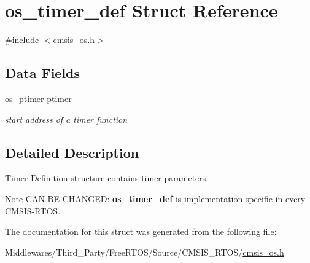 \hypertarget{structos__timer__def}{}\section{os\+\_\+timer\+\_\+def Struct Reference}
\label{structos__timer__def}


{\ttfamily \#include $<$cmsis\+\_\+os.\+h$>$}

\subsection*{Data Fields}
\begin{DoxyCompactItemize}
\item 
\mbox{\label{structos__timer__def_a15773df83aba93f8e61f3737af5fae47}} 
\mbox{\hyperlink{cmsis__os_8h_a7904cad2180c6b3a0ac112fe8ff273e7}{os\+\_\+ptimer}} \mbox{\hyperlink{structos__timer__def_a15773df83aba93f8e61f3737af5fae47}{ptimer}}
\begin{DoxyCompactList}\small\item\em start address of a timer function \end{DoxyCompactList}\end{DoxyCompactItemize}


\subsection{Detailed Description}
Timer Definition structure contains timer parameters. \begin{DoxyNote}{Note}
C\+AN BE C\+H\+A\+N\+G\+ED\+: {\bfseries \mbox{\hyperlink{structos__timer__def}{os\+\_\+timer\+\_\+def}}} is implementation specific in every C\+M\+S\+I\+S-\/\+R\+T\+OS. 
\end{DoxyNote}


The documentation for this struct was generated from the following file\+:\begin{DoxyCompactItemize}
\item 
Middlewares/\+Third\+\_\+\+Party/\+Free\+R\+T\+O\+S/\+Source/\+C\+M\+S\+I\+S\+\_\+\+R\+T\+O\+S/\mbox{\hyperlink{cmsis__os_8h}{cmsis\+\_\+os.\+h}}\end{DoxyCompactItemize}
